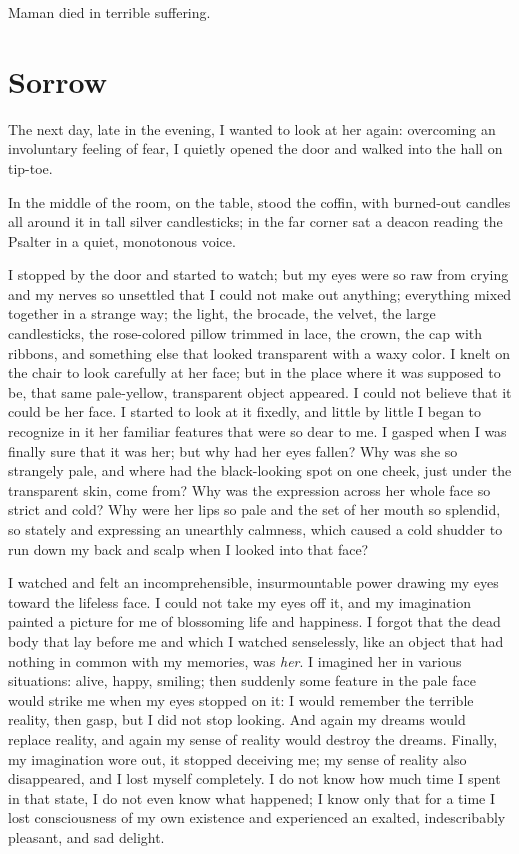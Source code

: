 Maman died in terrible suffering.

\chapter{Sorrow} %

The next day, late in the evening, I wanted to look at her again: overcoming an involuntary feeling of fear, I quietly opened the door and walked into the hall on tip-toe.

In the middle of the room, on the table, stood the coffin, with burned-out candles all around it in tall silver candlesticks; in the far corner sat a deacon reading the Psalter in a quiet, monotonous voice.

I stopped by the door and started to watch; but my eyes were so raw from crying and my nerves so unsettled that I could not make out anything; everything mixed together in a strange way; the light, the brocade, the velvet, the large candlesticks, the rose-colored pillow trimmed in lace, the crown, the cap with ribbons, and something else that looked transparent with a waxy color. I knelt on the chair to look carefully at her face; but in the place where it was supposed to be, that same pale-yellow, transparent object appeared. I could not believe that it could be her face. I started to look at it fixedly, and little by little I began to recognize in it her familiar features that were so dear to me. I gasped when I was finally sure that it was her; but why had her eyes fallen? Why was she so strangely pale, and where had the black-looking spot on one cheek, just under the transparent skin, come from? Why was the expression across her whole face so strict and cold? Why were her lips so pale and the set of her mouth so splendid, so stately and expressing an unearthly calmness, which caused a cold shudder to run down my back and scalp when I looked into that face?

I watched and felt an incomprehensible, insurmountable power drawing my eyes toward the lifeless face. I could not take my eyes off it, and my imagination painted a picture for me of blossoming life and happiness. I forgot that the dead body that lay before me and which I watched senselessly, like an object that had nothing in common with my memories, was \emph{her}. I imagined her in various situations: alive, happy, smiling; then suddenly some feature in the pale face would strike me when my eyes stopped on it: I would remember the terrible reality, then gasp, but I did not stop looking. And again my dreams would replace reality, and again my sense of reality would destroy the dreams. Finally, my imagination wore out, it stopped deceiving me; my sense of reality also disappeared, and I lost myself completely. I do not know how much time I spent in that state, I do not even know what happened; I know only that for a time I lost consciousness of my own existence and experienced an exalted, indescribably pleasant, and sad delight.

